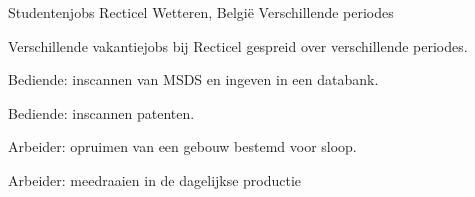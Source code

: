 \begin{cventries}
\cventry
{Studentenjobs} %
{Recticel} %
{Wetteren, België} %
{Verschillende periodes } %
{ %
\begin{cvitems}
\item {Verschillende vakantiejobs bij Recticel gespreid over verschillende periodes.}
\item {Bediende: inscannen van MSDS en ingeven in een databank.}
\item {Bediende: inscannen patenten.}
\item {Arbeider: opruimen van een gebouw bestemd voor sloop.}
\item {Arbeider: meedraaien in de dagelijkse productie}
\end{cvitems}
}



\end{cventries}